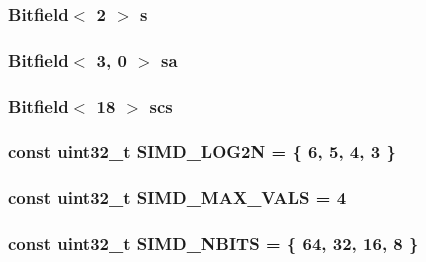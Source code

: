 \label{namespaceMipsISA_a6e1658c107856e035b6bc91e7f70ef37}
\hypertarget{namespaceMipsISA_a209620662d8286467e6fb5140ec75e11}{
\subsubsection[{s}]{\setlength{\rightskip}{0pt plus 5cm}Bitfield$<$ 2 $>$ {\bf s}}}
\label{namespaceMipsISA_a209620662d8286467e6fb5140ec75e11}
\hypertarget{namespaceMipsISA_ac5212d09029b84b4ed4df34dd739329a}{
\subsubsection[{sa}]{\setlength{\rightskip}{0pt plus 5cm}Bitfield$<$ 3, 0 $>$ {\bf sa}}}
\label{namespaceMipsISA_ac5212d09029b84b4ed4df34dd739329a}
\hypertarget{namespaceMipsISA_a70ab86e033d1b511ca553b4bf9957427}{
\subsubsection[{scs}]{\setlength{\rightskip}{0pt plus 5cm}Bitfield$<$ 18 $>$ {\bf scs}}}
\label{namespaceMipsISA_a70ab86e033d1b511ca553b4bf9957427}
\hypertarget{namespaceMipsISA_a41798bc9afd86d9d94d0f0b3cffca914}{
\subsubsection[{SIMD\_\-LOG2N}]{\setlength{\rightskip}{0pt plus 5cm}const {\bf uint32\_\-t} {\bf SIMD\_\-LOG2N} = \{ 6, 5, 4, 3 \}}}
\label{namespaceMipsISA_a41798bc9afd86d9d94d0f0b3cffca914}
\hypertarget{namespaceMipsISA_a3eb40046a295c31f2628bf84a5fde7d1}{
\subsubsection[{SIMD\_\-MAX\_\-VALS}]{\setlength{\rightskip}{0pt plus 5cm}const {\bf uint32\_\-t} {\bf SIMD\_\-MAX\_\-VALS} = 4}}
\label{namespaceMipsISA_a3eb40046a295c31f2628bf84a5fde7d1}
\hypertarget{namespaceMipsISA_ac6d349533fc98005c8ccf294db7b8033}{
\subsubsection[{SIMD\_\-NBITS}]{\setlength{\rightskip}{0pt plus 5cm}const {\bf uint32\_\-t} {\bf SIMD\_\-NBITS} = \{ 64, 32, 16, 8 \}}}

